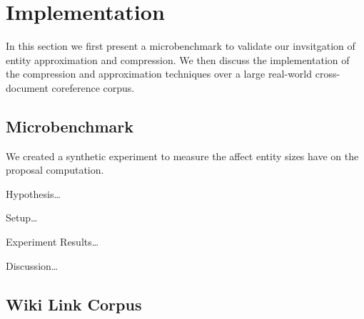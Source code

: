 
\section{Implementation}

In this section we first present a microbenchmark to validate our invsitgation of entity approximation and compression.
We then discuss the implementation of the compression and approximation techniques over a large real-world
cross-document coreference corpus.

\subsection{Microbenchmark}
\label{sec:microbenchmark}
We created a synthetic experiment to measure the
affect entity sizes have on the proposal computation.

Hypothesis\ldots

Setup\ldots

Experiment Results\ldots

Discussion\ldots

\subsection{Wiki Link Corpus}


